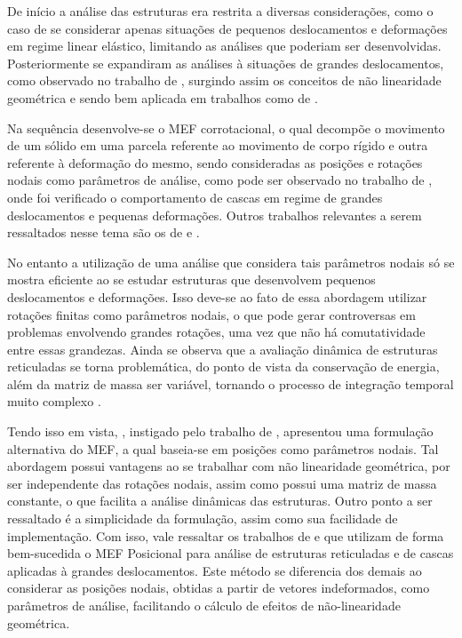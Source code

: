 De início a análise das estruturas era restrita a diversas considerações, como o caso de se considerar apenas situações de pequenos deslocamentos e deformações em regime linear elástico, limitando as análises que poderiam ser desenvolvidas. Posteriormente se expandiram as análises à situações de grandes deslocamentos, como observado no trabalho de , surgindo assim os conceitos de não linearidade geométrica e sendo bem aplicada em trabalhos como de .

Na sequência desenvolve-se o MEF corrotacional, o qual decompõe o movimento de um sólido em uma parcela referente ao movimento de corpo rígido e outra referente à deformação do mesmo, sendo consideradas as posições e rotações nodais como parâmetros de análise, como pode ser observado no trabalho de , onde foi verificado o comportamento de cascas em regime de grandes deslocamentos e pequenas deformações. Outros trabalhos relevantes a serem ressaltados nesse tema são os de  e .

No entanto a utilização de uma análise que considera tais parâmetros nodais só se mostra eficiente ao se estudar estruturas que desenvolvem pequenos deslocamentos e deformações. Isso deve-se ao fato de essa abordagem utilizar rotações finitas como parâmetros nodais, o que pode gerar controversas em problemas envolvendo grandes rotações, uma vez que não há comutatividade entre essas grandezas. Ainda se observa que a avaliação dinâmica de estruturas reticuladas se torna problemática, do ponto de vista da conservação de energia, além da matriz de massa ser variável, tornando o processo de integração temporal muito complexo \cite{sanches2013unconstrained}.

Tendo isso em vista, , instigado pelo trabalho de , apresentou uma formulação alternativa do MEF, a qual baseia-se em posições como parâmetros nodais. Tal abordagem possui vantagens ao se trabalhar com não linearidade geométrica, por ser independente das rotações nodais, assim como possui uma matriz de massa constante, o que facilita a análise dinâmicas das estruturas. Outro ponto a ser ressaltado é a simplicidade da formulação, assim como sua facilidade de implementação. Com isso, vale ressaltar os trabalhos de  e  que utilizam de forma bem-sucedida o MEF Posicional para análise de estruturas reticuladas e de cascas aplicadas à grandes deslocamentos. Este método se diferencia dos demais ao considerar as posições nodais, obtidas a partir de vetores indeformados, como parâmetros de análise, facilitando o cálculo de efeitos de não-linearidade geométrica.

